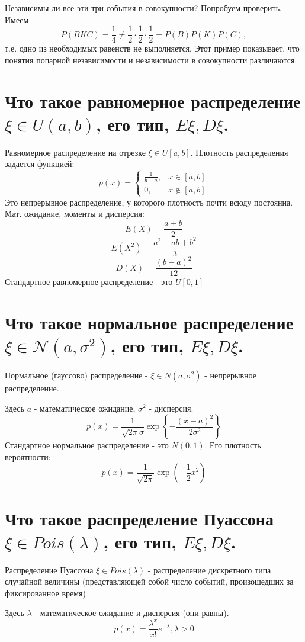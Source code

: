 Независимы ли все эти три события в совокупности? Попробуем проверить. Имеем
\[ P(BKC) = \frac{1}{4} \ne \frac{1}{2} \cdot \frac{1}{2} \cdot \frac{1}{2} = P(B) P(K) P(C), \]
т.е. одно из необходимых равенств не выполняется. Этот пример показывает, что понятия попарной независимости и независимости в совокупности различаются.

\section{Что такое равномерное распределение $\xi \in U(a, b)$, его тип, $E\xi, D\xi$.}

\noindent Равномерное распределение на отрезке $\xi \in U[a, b]$. Плотность распределения задается функцией:
\[
p(x) =
\begin{cases}
	\frac{1}{b-a}, &x \in [a, b] \\
	0, &x \notin [a, b]
\end{cases}
\]
Это непрерывное распределение, у которого плотность почти всюду постоянна.
Мат. ожидание, моменты и дисперсия:
\[E(X) = \dfrac{a+b}{2}\]
\[E(X^2) = \dfrac{a^2+ab+b^2}{3}\]
\[D(X) = \dfrac{(b-a)^2}{12}\]
Стандартное равномерное распределение - это $U[0,1]$

\section{Что такое нормальное распределение $\xi \in \mathcal{N}(a, \sigma^2)$, его тип, $E\xi, D\xi$.}

\noindent Нормальное (гауссово) распределение - $\xi \in N(a, \sigma^2)$ - непрерывное распределение.

Здесь $a$ - математическое ожидание, $ \sigma^2$ - дисперсия.
\[ p(x) = \frac{1}{\sqrt{2 \pi} \sigma} \exp \left\{ - \frac{(x-a)^2}{2 \sigma^2} \right\} \]
Стандартное нормальное распределение - это $N(0,1)$.
Его плотность вероятности:
\[ p(x) = \dfrac{1}{\sqrt{2\pi}}\exp(-\frac{1}{2}x^2)\]

\section{Что такое распределение Пуассона $\xi \in Pois (\lambda)$, его тип, $E\xi, D\xi$.}

Распределение Пуассона $\xi \in Pois(\lambda)$ - распределение дискретного типа случайной величины (представляющей собой число событий, произошедших за фиксированное время)

Здесь $\lambda$ - математическое ожидание и дисперсия (они равны).
\[p(x)=\frac{\lambda^x}{x!}e^{-\lambda}, \lambda>0\]

